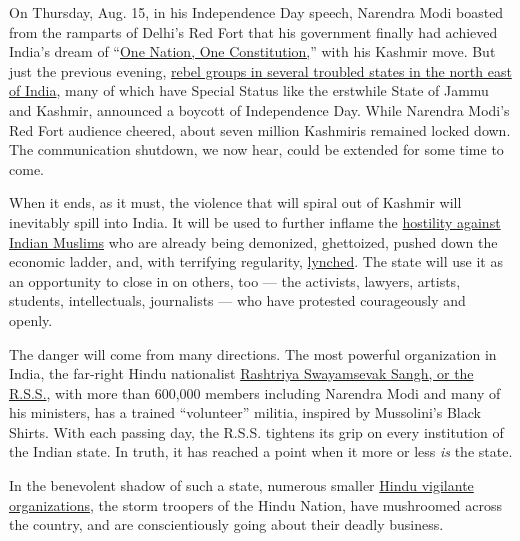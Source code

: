 On Thursday, Aug. 15, in his Independence Day speech, Narendra Modi
boasted from the ramparts of Delhi's Red Fort that his government
finally had achieved India's dream of
``\href{https://uk.reuters.com/article/uk-india-independenceday-modi/indias-modi-trumpets-kashmir-muslim-marriage-moves-in-independence-day-speech-idUKKCN1V50K4}{One
Nation, One Constitution,}'' with his Kashmir move. But just the
previous evening,
\href{https://www.indiatoday.in/india/story/kashmir-effect-rebel-groups-ban-independence-day-celebrations-in-northeast-1580947-2019-08-14}{rebel
groups in several troubled states in the north east of India}, many of
which have Special Status like the erstwhile State of Jammu and Kashmir,
announced a boycott of Independence Day. While Narendra Modi's Red Fort
audience cheered, about seven million Kashmiris remained locked down.
The communication shutdown, we now hear, could be extended for some time
to come.

When it ends, as it must, the violence that will spiral out of Kashmir
will inevitably spill into India. It will be used to further inflame the
\href{https://www.nytimes.com/2017/08/17/opinion/india-muslims-hindus-partition.html}{hostility
against Indian Muslims} who are already being demonized, ghettoized,
pushed down the economic ladder, and, with terrifying regularity,
\href{https://www.youtube.com/watch?v=UFRuKs7ZfEk}{lynched}. The state
will use it as an opportunity to close in on others, too --- the
activists, lawyers, artists, students, intellectuals, journalists ---
who have protested courageously and openly.

The danger will come from many directions. The most powerful
organization in India, the far-right Hindu nationalist
\href{https://www.nytimes.com/2003/02/02/magazine/the-other-face-of-fanaticism.html}{Rashtriya
Swayamsevak Sangh, or the R.S.S.}, with more than 600,000 members
including Narendra Modi and many of his ministers, has a trained
``volunteer'' militia, inspired by Mussolini's Black Shirts. With each
passing day, the R.S.S. tightens its grip on every institution of the
Indian state. In truth, it has reached a point when it more or less
\emph{is} the state.

In the benevolent shadow of such a state, numerous smaller
\href{https://caravanmagazine.in/vantage/the-rss-bhonsala-military-school-dhirendra-k-jha}{Hindu
vigilante organizations}, the storm troopers of the Hindu Nation, have
mushroomed across the country, and are conscientiously going about their
deadly business.

